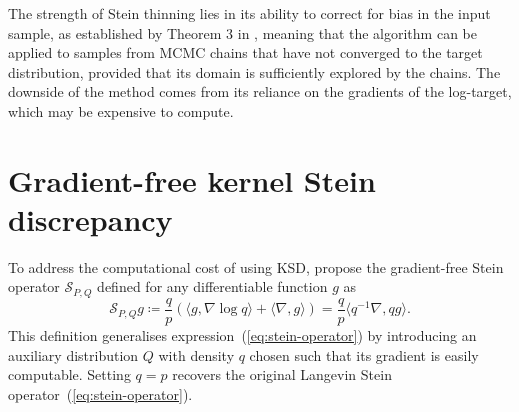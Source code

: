 \documentclass[11pt,a4paper]{report}
\begin{document}
The strength of Stein thinning lies in its ability to correct for bias in the input sample, as established by Theorem 3 in \cite{riabizOptimalThinningMCMC2022}, meaning that the algorithm can be applied to samples from MCMC chains that have not converged to the target distribution, provided that its domain is sufficiently explored by the chains. The downside of the method comes from its reliance on the gradients of the log-target, which may be expensive to compute.

\section{Gradient-free kernel Stein discrepancy}

To address the computational cost of using KSD, \cite{fisherGradientFreeKernelStein2024} propose the gradient-free Stein operator $\mathcal{S}_{P,Q}$ defined for any differentiable function $g$ as
\begin{equation}
\mathcal{S}_{P,Q} g \coloneq \frac{q}{p}(\langle g, \nabla \log q \rangle + \langle \nabla, g \rangle) = \frac{q}{p} \langle q^{-1}\nabla, q g \rangle.
\end{equation}
This definition generalises expression~(\ref{eq:stein-operator}) by introducing an auxiliary distribution $Q$ with density $q$ chosen such that its gradient is easily computable. Setting $q = p$ recovers the original Langevin Stein operator~(\ref{eq:stein-operator}).
\end{document}
